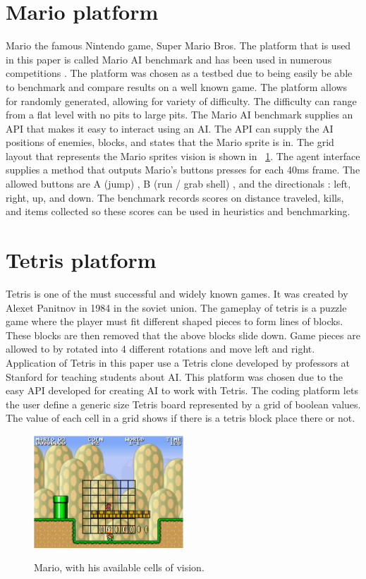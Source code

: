 \documentclass[12pt]{ucthesis} \newif\ifpdf \ifx\pdfoutput\undefined
\begin{document}
\section{Mario platform}
Mario the famous Nintendo game, Super Mario Bros.  The platform
that is used in this paper is called Mario AI benchmark and has been used in
numerous competitions \cite{karakovskiy2012mario}. The platform was chosen as a
testbed due to being easily be able to benchmark and compare results on a well
known game. The platform allows for randomly generated, allowing for variety of
difficulty. The difficulty can range from a flat level with no pits to large
pits. The Mario AI benchmark supplies an API that makes it easy to interact
using an AI. The API can supply the AI positions of enemies, blocks, and states
that the Mario sprite is in. The grid layout that represents the Mario sprites
vision is shown in ~\ref{fig:mariogrid}. The agent interface supplies a method
that outputs Mario’s buttons presses for each 40ms frame. The allowed buttons
are A (jump) , B (run / grab shell) , and the directionals : left, right, up,
and down. The benchmark records scores on distance traveled, kills, and items
collected so these scores can be used in heuristics and benchmarking.

\section{Tetris platform}

Tetris is one of the must successful and widely known games. It was created by
Alexet Panitnov in 1984 in the soviet union. The gameplay of tetris is a puzzle
game where the player must fit different shaped pieces to form lines of blocks.
These blocks are then removed that the above blocks slide down. Game pieces are
allowed to by rotated into 4 different rotations and move left and right.
Application of Tetris in this paper use a Tetris clone developed by professors
at Stanford for teaching students about AI. This platform was chosen due to the
easy API developed for creating AI to work with Tetris. The coding platform lets
the user define a generic size Tetris board represented by a grid of boolean
values. The value of each cell in a grid shows if there is a tetris block place
there or not.

\begin{figure}[h!]
  \caption{Mario, with his available cells of vision.}
  \centering
    \includegraphics[width=0.5\textwidth]{mariogrid.png}
   \label{fig:mariogrid} 
\end{figure}
\end{document}
